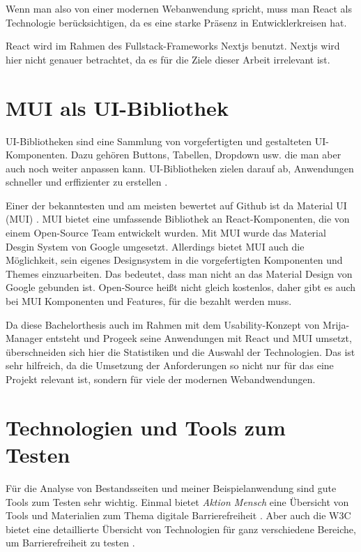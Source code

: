 Wenn man also von einer modernen Webanwendung spricht, muss man React als Technologie berücksichtigen, da es eine starke Präsenz in Entwicklerkreisen hat. 

React wird im Rahmen des Fullstack-Frameworks Nextjs benutzt. Nextjs wird hier nicht genauer betrachtet, da es für die Ziele dieser Arbeit irrelevant ist.

\section{MUI als UI-Bibliothek}
UI-Bibliotheken sind eine Sammlung von vorgefertigten und gestalteten UI-Komponenten. Dazu gehören Buttons, Tabellen, Dropdown usw. die man aber auch noch weiter anpassen kann. UI-Bibliotheken zielen darauf ab, Anwendungen schneller und erffizienter zu erstellen \parencite[vgl.][]{strapi_uilibraries_2024}.

Einer der bekanntesten und am meisten bewertet auf Github ist da Material UI (MUI) \parencite[vgl.][]{smile_uilibraries_2024}. MUI bietet eine umfassende Bibliothek an React-Komponenten, die von einem Open-Source Team entwickelt wurden. Mit MUI wurde das Material Desgin System von Google umgesetzt. Allerdings bietet MUI auch die Möglichkeit, sein eigenes Designsystem in die vorgefertigten Komponenten und Themes einzuarbeiten. Das bedeutet, dass man nicht an das Material Design von Google gebunden ist. Open-Source heißt nicht gleich kostenlos, daher gibt es auch bei MUI Komponenten und Features, für die bezahlt werden muss.

Da diese Bachelorthesis auch im Rahmen mit dem Usability-Konzept von Mrija-Manager entsteht und Progeek seine Anwendungen mit React und MUI umsetzt, überschneiden sich hier die Statistiken und die Auswahl der Technologien. Das ist sehr hilfreich, da die Umsetzung der Anforderungen so nicht nur für das eine Projekt relevant ist, sondern für viele der modernen Webandwendungen.

\section{Technologien und Tools zum Testen}
Für die Analyse von Bestandsseiten und meiner Beispielanwendung sind gute Tools zum Testen sehr wichtig. Einmal bietet \textit{Aktion Mensch} eine Übersicht von Tools und Materialien zum Thema digitale Barrierefreiheit \parencite[vgl.][]{aktionmensch_testingtools_nodate}. Aber auch die W3C bietet eine detaillierte Übersicht von Technologien für ganz verschiedene Bereiche, um Barrierefreiheit zu testen \parencite[vgl.][]{w3c_testingtools_2024}.

